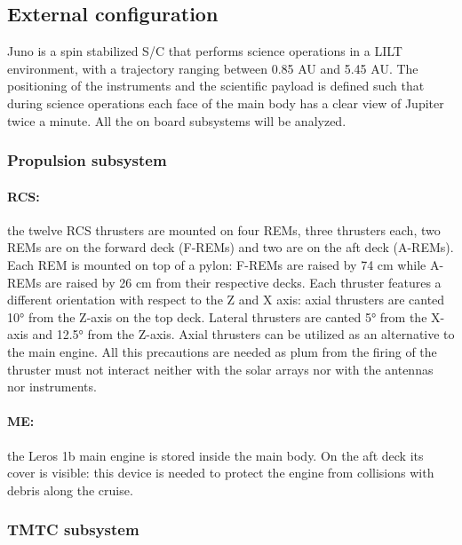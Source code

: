 \subsection{External configuration}
\label{subsec:external_config}

Juno is a spin stabilized S/C that performs science operations in a LILT environment, with a trajectory ranging between 0.85 AU and 5.45 AU. The positioning of the instruments and the scientific payload is defined such that during science operations each face of the main body has a clear view of Jupiter twice a minute. All the on board subsystems will be analyzed. 

\subsubsection{Propulsion subsystem}
\label{subsubsec:prop_sub}

\paragraph{RCS:}the twelve RCS thrusters are mounted on four REMs, three thrusters each, two REMs are on the forward deck (F-REMs) and two are on the aft deck (A-REMs). 
Each REM is mounted on top of a pylon: F-REMs are raised by 74 cm while A-REMs are raised by 26 cm from their respective decks. Each thruster features a different orientation with respect to the Z and X axis: axial thrusters are canted 10° from the Z-axis on the top deck. Lateral thrusters are canted 5° from the X-axis and 12.5° from the Z-axis. Axial thrusters can be utilized as an alternative to the main engine.  
\cite{juno_inner}
All this precautions are needed as plum from the firing of the thruster must not interact neither with the solar arrays nor with the antennas nor instruments.

\vspace{-4mm}

\paragraph{ME:}the Leros 1b main engine is stored inside the main body. On the aft deck its cover is visible: this device is needed to protect the engine from collisions with debris along the cruise. 

\subsubsection{TMTC subsystem}
\label{subsubsec:tmtc_sub}

